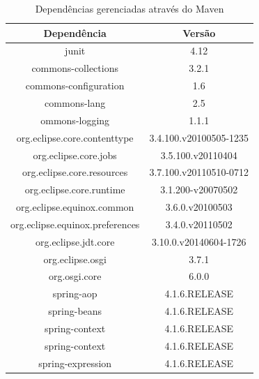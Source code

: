 \begin{table}[ht]
	\centering
	\caption{Dependências gerenciadas através do Maven}
		\begin{tabular}{c|c}%
			\hline \hline
			\textbf{Dependência}    &   \textbf{Versão}\\ \hline
			junit 			    	&	4.12 \\ \hline
			commons-collections 	&	3.2.1 \\ \hline
			commons-configuration 	&	1.6 \\ \hline
			commons-lang 	    	&	2.5 \\ \hline
			ommons-logging 			&	1.1.1 \\ \hline
			org.eclipse.core.contenttype & 3.4.100.v20100505-1235 \\ \hline
			org.eclipse.core.jobs 		&	3.5.100.v20110404 \\ \hline
			org.eclipse.core.resources  &	3.7.100.v20110510-0712 \\ \hline
			org.eclipse.core.runtime		&	3.1.200-v20070502 \\ \hline
			org.eclipse.equinox.common		&	3.6.0.v20100503 \\ \hline
			org.eclipse.equinox.preferences &	3.4.0.v20110502 \\ \hline
			org.eclipse.jdt.core 			&	3.10.0.v20140604-1726 \\ \hline
			org.eclipse.osgi 	&	3.7.1 \\ \hline
			org.osgi.core 		&	6.0.0 \\ \hline
			spring-aop 	    	&	4.1.6.RELEASE \\ \hline
			spring-beans 		&	4.1.6.RELEASE \\ \hline
			spring-context 		&	4.1.6.RELEASE \\ \hline
			spring-context 		&	4.1.6.RELEASE \\ \hline 		
			spring-expression 	&	4.1.6.RELEASE \\ \hline
		\end{tabular}
	
\end{table}



